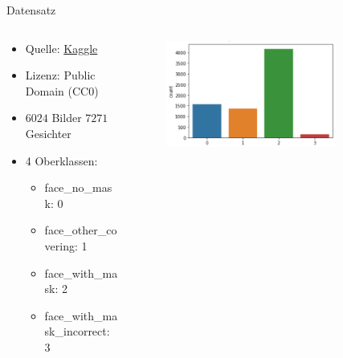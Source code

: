 \documentclass[aspectratio=1610, 9pt]{beamer}
\begin{document}
\begin{frame}{Datensatz}
  \begin{columns}
    \begin{column}{0.48\textwidth}
      \begin{itemize}
        \item Quelle: \href{https://www.kaggle.com/wobotintelligence/face-mask-detection-dataset/data}{Kaggle}
        \item Lizenz: Public Domain (CC0)
        \item $6024$ Bilder \textrightarrow $7271$ Gesichter
        \item 4 Oberklassen: 
        \begin{itemize}
          \item face\_no\_mask: 0
          \item face\_other\_covering: 1
          \item face\_with\_mask: 2
          \item face\_with\_mask\_incorrect: 3
        \end{itemize}
        \end{itemize}
    \end{column}
    \begin{column}{0.48\textwidth}
      \begin{figure}
        \centering
        \includegraphics[width = 0.8\textwidth]{images/Verteilung.png}
      \end{figure}
    \end{column}
  \end{columns}  
\end{frame}
\end{document}
